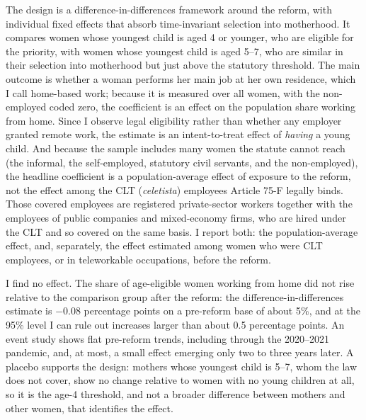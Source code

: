 \documentclass[12pt]{article}
\begin{document}
The design is a difference-in-differences framework around the reform, with individual fixed effects that absorb time-invariant selection into motherhood. It compares women whose youngest child is aged 4 or younger, who are eligible for the priority, with women whose youngest child is aged 5--7, who are similar in their selection into motherhood but just above the statutory threshold. The main outcome is whether a woman performs her main job at her own residence, which I call home-based work; because it is measured over all women, with the non-employed coded zero, the coefficient is an effect on the population share working from home. Since I observe legal eligibility rather than whether any employer granted remote work, the estimate is an intent-to-treat effect of \emph{having} a young child. And because the sample includes many women the statute cannot reach (the informal, the self-employed, statutory civil servants, and the non-employed), the headline coefficient is a population-average effect of exposure to the reform, not the effect among the CLT (\emph{celetista}) employees Article 75-F legally binds. Those covered employees are registered private-sector workers together with the employees of public companies and mixed-economy firms, who are hired under the CLT and so covered on the same basis. I report both: the population-average effect, and, separately, the effect estimated among women who were CLT employees, or in teleworkable occupations, before the reform.

I find no effect. The share of age-eligible women working from home did not rise relative to the comparison group after the reform: the difference-in-differences estimate is $-0.08$ percentage points on a pre-reform base of about 5\%, and at the 95\% level I can rule out increases larger than about 0.5 percentage points. An event study shows flat pre-reform trends, including through the 2020--2021 pandemic, and, at most, a small effect emerging only two to three years later. A placebo supports the design: mothers whose youngest child is 5--7, whom the law does not cover, show no change relative to women with no young children at all, so it is the age-4 threshold, and not a broader difference between mothers and other women, that identifies the effect.
\end{document}
